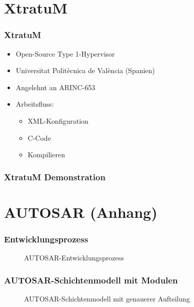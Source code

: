 \documentclass[]{beamer}
\newcommand{\inputImage}[1]{}
\begin{document}
\section*{XtratuM}
\label{sec:XtratuM_anhang}

\begin{frame}
\frametitle{XtratuM}
    \begin{itemize}
        \item Open-Source Type 1-Hypervisor
        \item Universitat Politècnica de València (Spanien)
        \item Angelehnt an ARINC-653
        \item Arbeitsfluss:
        \begin{itemize}
            \item XML-Konfiguration
            \item C-Code
            \item Kompilieren
        \end{itemize}
    \end{itemize}
\end{frame}

\begin{frame}
\frametitle{XtratuM Demonstration}

\end{frame}

\section*{AUTOSAR (Anhang)}
\label{sec:autosar_anhang}


\begin{frame}
\frametitle{Entwicklungsprozess}
    \begin{figure}[ht]
        \centering
        \resizebox{0.98\linewidth}{!}{\inputImage{Autosar_Prozess.dia}}
        \caption{AUTOSAR-Entwicklungsprozess}
        \label{fig:autosar_prozess}
    \end{figure}
\end{frame}

\begin{frame}
\frametitle{AUTOSAR-Schichtenmodell mit Modulen}
    \begin{figure}[ht]
        \centering
        \resizebox{0.98\linewidth}{!}{\inputImage{autosar_refined_layer.dia}}
        \caption{AUTOSAR-Schichtenmodell mit genauerer Aufteilung}
        \label{fig:autosar_refined_layer}
    \end{figure}
\end{frame}
\end{document}
